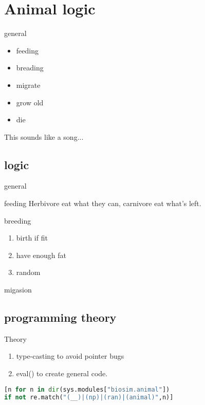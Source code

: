 \section{Animal logic}

\begin{frame}{general}
\begin{itemize}
\item<+-> feeding
\item<+-> breading %
\item<+-> migrate
\item<+-> grow old
\item<+-> die
\end{itemize}
\pause This sounds like a song...
\end{frame}

\subsection{logic}

\begin{frame}{general}
\begin{block}{feeding}
Herbivore eat what they can, carnivore eat what's left.
\end{block}

\begin{block}{breeding}
\begin{enumerate}[<+->]
\item birth if fit
\item have enough fat
\item random
\end{enumerate}
\end{block}

\begin{block}{migasion}
\end{block}
\end{frame}

\subsection{programming theory}

\begin{frame}{Theory}
\begin{enumerate}
\item type-casting to avoid pointer bugs
\item eval() to create general code.
\end{enumerate}
\end{frame}

\begin{frame}[fragile]

\begin{lstlisting}[language=Python,basicstyle=\small]
[n for n in dir(sys.modules["biosim.animal"]) 
if not re.match("(__)|(np)|(ran)|(animal)",n)]
\end{lstlisting}

\end{frame}